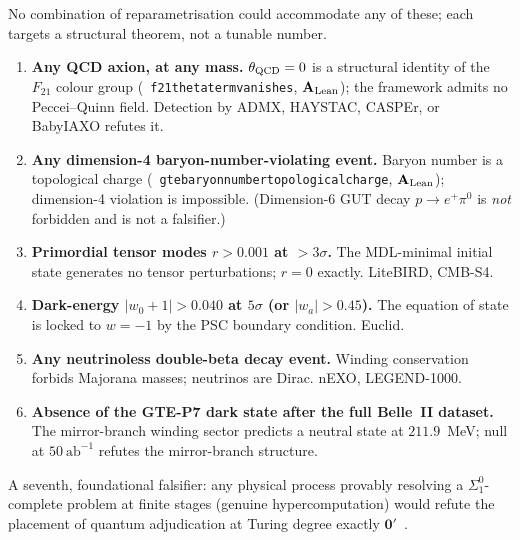 \documentclass[11pt]{article}
\newcommand{\lean}[1]{%
  \penalty-100
  \begingroup\def\_{\textunderscore\allowbreak}\texttt{#1}\endgroup}
\newcommand{\CatAL}{\ensuremath{\textbf{A}_{\rm Lean}}}
\begin{document}
\begin{tcolorbox}[colback=red!5,colframe=red!60,
  title={Six measurements that would individually refute GTE}]
\small
No combination of reparametrisation could accommodate any of these; each targets a
structural theorem, not a tunable number.
\begin{enumerate}[leftmargin=1.6em,itemsep=2pt]
\item \textbf{Any QCD axion, at any mass.}  $\theta_{\rm QCD}=0$ is a structural
  identity of the $F_{21}$ colour group
  (\mbox{\lean{f21\_theta\_term\_vanishes}}, \CatAL); the framework admits no
  Peccei--Quinn field.  Detection by ADMX, HAYSTAC, CASPEr, or BabyIAXO refutes it.
\item \textbf{Any dimension-4 baryon-number-violating event.}  Baryon number is a
  topological charge (\mbox{\lean{gte\_baryon\_number\_topological\_charge}},
  \CatAL); dimension-4 violation is impossible.  (Dimension-6 GUT decay
  $p\to e^+\pi^0$ is \emph{not} forbidden and is not a falsifier.)
\item \textbf{Primordial tensor modes $r > 0.001$ at $>3\sigma$.}  The MDL-minimal
  initial state generates no tensor perturbations; $r=0$ exactly.  LiteBIRD,
  CMB-S4.
\item \textbf{Dark-energy $|w_0+1| > 0.040$ at $5\sigma$ (or $|w_a|>0.45$).}  The
  equation of state is locked to $w=-1$ by the PSC boundary condition.  Euclid.
\item \textbf{Any neutrinoless double-beta decay event.}  Winding conservation
  forbids Majorana masses; neutrinos are Dirac.  nEXO, LEGEND-1000.
\item \textbf{Absence of the GTE-P7 dark state after the full Belle~II dataset.}
  The mirror-branch winding sector predicts a neutral state at $211.9$~MeV; null
  at $50~\mathrm{ab}^{-1}$ refutes the mirror-branch structure.
\end{enumerate}
A seventh, foundational falsifier: any physical process provably resolving a
$\Sigma^0_1$-complete problem at finite stages (genuine hypercomputation) would
refute the placement of quantum adjudication at Turing degree exactly
$\mathbf{0}'$~\cite{SpivackPolynomialTransputation}.
\end{tcolorbox}
\end{document}
